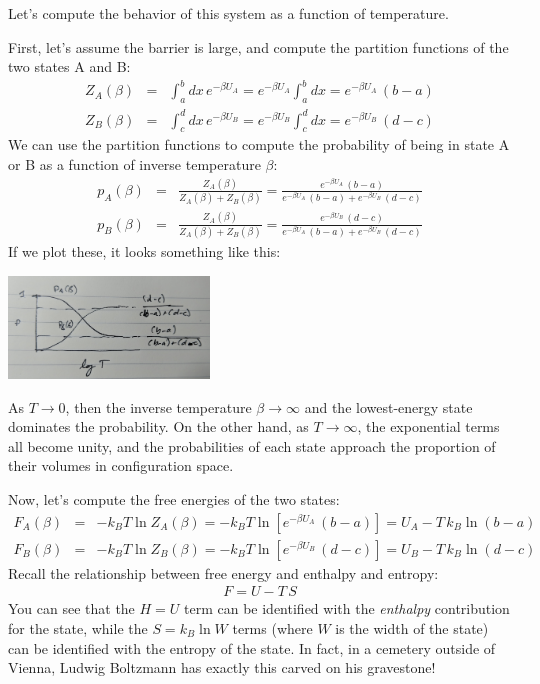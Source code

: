 \documentclass[english,course]{lecture}
\begin{document}
Let's compute the behavior of this system as a function of temperature.

First, let's assume the barrier is large, and compute the partition functions of the two states A and B:
\begin{eqnarray}
Z_A(\beta) &=& \int_a^b dx \, e^{-\beta U_A} = e^{-\beta U_A} \int_a^b dx = e^{-\beta U_A} \, (b-a) \\
Z_B(\beta) &=& \int_c^d dx \, e^{-\beta U_B} = e^{-\beta U_B} \int_c^d dx = e^{-\beta U_B} \, (d-c)
\end{eqnarray}
We can use the partition functions to compute the probability of being in state A or B as a function of inverse temperature $\beta$:
\begin{eqnarray}
p_A(\beta) &=& \frac{Z_A(\beta)}{Z_A(\beta) + Z_B(\beta)} = \frac{e^{-\beta U_A} \, (b-a)}{ e^{-\beta U_A} \, (b-a) + e^{-\beta U_B} \, (d-c) } \\
p_B(\beta) &=& \frac{Z_A(\beta)}{Z_A(\beta) + Z_B(\beta)} = \frac{e^{-\beta U_B} \, (d-c)}{ e^{-\beta U_A} \, (b-a) + e^{-\beta U_B} \, (d-c) }
\end{eqnarray}
If we plot these, it looks something like this:

\begin{centering}
\includegraphics[width=0.4\textwidth]{figures/two-state-probability.jpg}

\end{centering}

As $T \rightarrow 0$, then the inverse temperature $\beta \rightarrow \infty$ and the lowest-energy state dominates the probability.
On the other hand, as $T \rightarrow \infty$, the exponential terms all become unity, and the probabilities of each state approach the proportion of their volumes in configuration space.

Now, let's compute the free energies of the two states:
\begin{eqnarray}
F_A(\beta) &=& - k_B T \ln Z_A(\beta) = - k_B T \ln \left[ e^{-\beta U_A} \, (b-a) \right] = U_A - T \, k_B  \ln (b-a)  \\
F_B(\beta) &=& - k_B T \ln Z_B(\beta) = - k_B T \ln \left[ e^{-\beta U_B} \, (d-c) \right] = U_B - T \, k_B \ln (d-c)
\end{eqnarray}
Recall the relationship between free energy and enthalpy and entropy:
\begin{eqnarray}
F = U - T \, S
\end{eqnarray}
You can see that the $H = U$ term can be identified with the \emph{enthalpy} contribution for the state, while the $S = k_B \ln W$ terms (where $W$ is the width of the state) can be identified with the entropy of the state.
In fact, in a cemetery outside of Vienna, Ludwig Boltzmann has exactly this carved on his gravestone!
\end{document}
